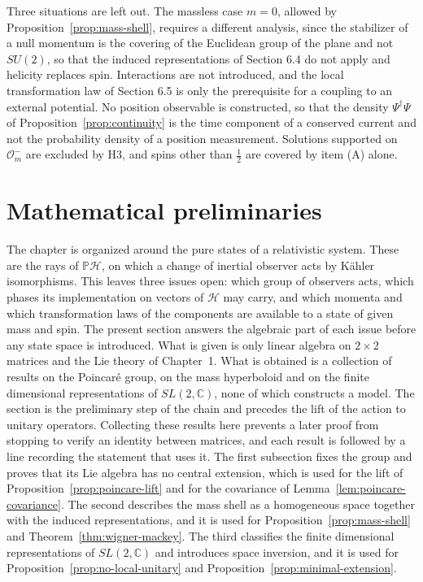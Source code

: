 \begin{remark}\label{rem:not-treated}
	Three situations are left out. The massless case $m=0$, allowed by Proposition~\ref{prop:mass-shell}, requires a different analysis, since the stabilizer of a null momentum is the covering of the Euclidean group of the plane and not $SU(2)$, so that the induced representations of Section 6.4 do not apply and helicity replaces spin. Interactions are not introduced, and the local transformation law of Section 6.5 is only the prerequisite for a coupling to an external potential. No position observable is constructed, so that the density $\Psi^\dagger\Psi$ of Proposition~\ref{prop:continuity} is the time component of a conserved current and not the probability density of a position measurement. Solutions supported on $\mathcal{O}_m^-$ are excluded by H3, and spins other than $\tfrac12$ are covered by item (A) alone.
\end{remark}

\section{Mathematical preliminaries}
\label{sec:preliminaries}

The chapter is organized around the pure states of a relativistic system. These are the rays of $\mathbb{P}\mathcal{H}$, on which a change of inertial observer acts by Kähler isomorphisms. This leaves three issues open: which group of observers acts, which phases its implementation on vectors of $\mathcal{H}$ may carry, and which momenta and which transformation laws of the components are available to a state of given mass and spin. The present section answers the algebraic part of each issue before any state space is introduced. What is given is only linear algebra on $2\times2$ matrices and the Lie theory of Chapter~1. What is obtained is a collection of results on the Poincar\'e group, on the mass hyperboloid and on the finite dimensional representations of $SL(2,\mathbb{C})$, none of which constructs a model. The section is the preliminary step of the chain and precedes the lift of the action to unitary operators. Collecting these results here prevents a later proof from stopping to verify an identity between matrices, and each result is followed by a line recording the statement that uses it. The first subsection fixes the group and proves that its Lie algebra has no central extension, which is used for the lift of Proposition~\ref{prop:poincare-lift} and for the covariance of Lemma~\ref{lem:poincare-covariance}. The second describes the mass shell as a homogeneous space together with the induced representations, and it is used for Proposition~\ref{prop:mass-shell} and Theorem~\ref{thm:wigner-mackey}. The third classifies the finite dimensional representations of $SL(2,\mathbb{C})$ and introduces space inversion, and it is used for Proposition~\ref{prop:no-local-unitary} and Proposition~\ref{prop:minimal-extension}.

